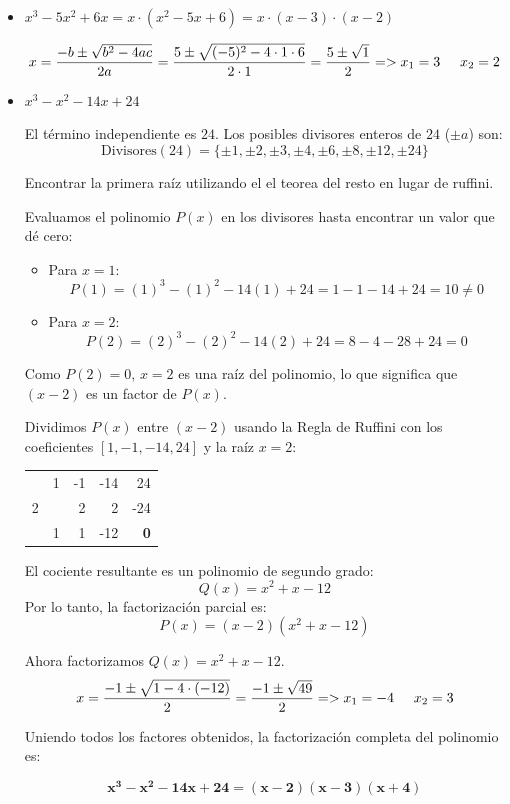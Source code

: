 \documentclass[a4paper,12pt]{article}
\begin{document}
\begin{itemize}
    \item $x^3-5x^2+6x = x \cdot (x^2-5x+6) = x \cdot (x-3) \cdot (x-2) $
    
    \[ x= \dfrac{-b \pm \sqrt{b^2 - 4ac}}{2a} = \dfrac{5 \pm \sqrt{(-5)^2-4 \cdot 1 \cdot 6}}{2 \cdot 1 } = \dfrac{5 \pm \sqrt{1}}{2} => x_1= 3 \hspace{0.5cm} x_2=2\]

    \item $x^3-x^2-14x+24$
    
    El término independiente es $24$. Los posibles divisores enteros de $24$ ($\pm a$) son:
    \[
    \text{Divisores}(24) = \{\pm 1, \pm 2, \pm 3, \pm 4, \pm 6, \pm 8, \pm 12, \pm 24\}
    \]

    Encontrar la primera raíz utilizando el el teorea del resto en lugar de ruffini. 

    Evaluamos el polinomio $P(x)$ en los divisores hasta encontrar un valor que dé cero:

    \begin{itemize}
        \item Para $x = 1$:
        \[ P(1) = (1)^3 - (1)^2 - 14(1) + 24 = 1 - 1 - 14 + 24 = 10 \neq 0 \]
        \item Para $x = 2$:
        \[ P(2) = (2)^3 - (2)^2 - 14(2) + 24 = 8 - 4 - 28 + 24 = 0 \]
    \end{itemize}

    Como $P(2) = 0$, $x = 2$ es una raíz del polinomio, lo que significa que \textbf{$(x - 2)$} es un factor de $P(x)$.

    Dividimos $P(x)$ entre $(x - 2)$ usando la Regla de Ruffini con los coeficientes $[1, -1, -14, 24]$ y la raíz $x = 2$:

    \begin{center}
    \begin{tabular}{r|rrrr}
    & 1 & -1 & -14 & 24 \\
    2 &   &  2 &   2 & -24 \\
    \hline
    & 1 &  1 & -12 & \textbf{0}
    \end{tabular}
    \end{center}

    El cociente resultante es un polinomio de segundo grado:
    \[
    Q(x) = x^2 + x - 12
    \]
    Por lo tanto, la factorización parcial es:
    \[
    P(x) = (x - 2)(x^2 + x - 12)
    \]

    Ahora factorizamos $Q(x) = x^2 + x - 12$. 
    \[
    x = \dfrac{-1 \pm \sqrt{ 1 - 4 \cdot (-12)}}{2} = \dfrac{-1 \pm \sqrt{49}}{2} => x_1 = -4 \hspace{0.5cm}x_2=3
    \]

    Uniendo todos los factores obtenidos, la factorización completa del polinomio es:

    \[
    \mathbf{x^3 - x^2 - 14x + 24 = (x - 2)(x - 3)(x + 4)}
    \]
\end{itemize}

 
\end{document}
